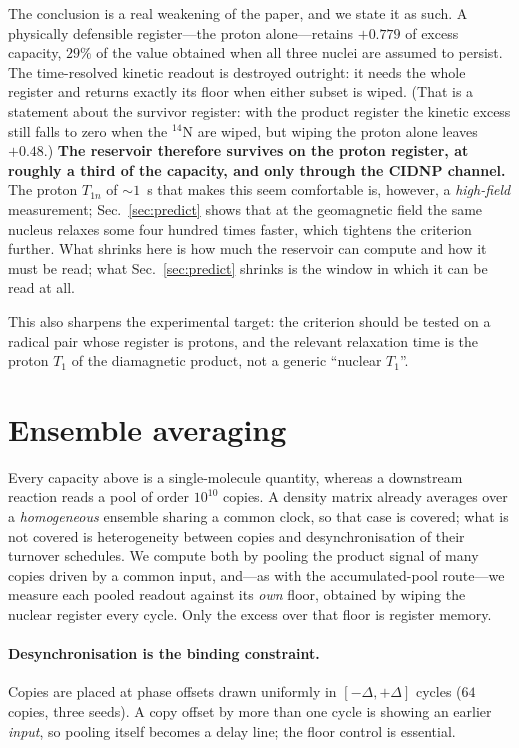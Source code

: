 \documentclass[aps,prx,reprint,superscriptaddress,nofootinbib,floatfix]{revtex4-2}
\begin{document}
The conclusion is a real weakening of the paper, and we state it as such. A
physically defensible register---the proton alone---retains
$+0.779$ of excess capacity, $29\%$ of the value obtained when all three nuclei
are assumed to persist. The time-resolved kinetic readout is destroyed outright:
it needs the whole register and returns exactly its floor when either subset is
wiped. (That is a statement about the survivor register: with the product register
the kinetic excess still falls to zero when the $^{14}$N are wiped, but wiping the
proton alone leaves $+0.48$.) \textbf{The reservoir therefore survives on the proton register, at roughly
a third of the capacity, and only through the CIDNP channel.} The proton
$T_{1n}$ of $\sim1$~s that makes this seem comfortable is, however, a
\emph{high-field} measurement; Sec.~\ref{sec:predict} shows that at the
geomagnetic field the same nucleus relaxes some four hundred times faster, which
tightens the criterion further. What shrinks here is how much the reservoir can
compute and how it must be read; what Sec.~\ref{sec:predict} shrinks is the
window in which it can be read at all.

This also sharpens the experimental target: the criterion should be tested on a
radical pair whose register is protons, and the relevant relaxation time is the
proton $T_1$ of the diamagnetic product, not a generic ``nuclear $T_1$''.

\section{Ensemble averaging}
\label{sec:ensemble}
Every capacity above is a single-molecule quantity, whereas a downstream reaction
reads a pool of order $10^{10}$ copies. A density matrix already averages over a
\emph{homogeneous} ensemble sharing a common clock, so that case is covered; what
is not covered is heterogeneity between copies and desynchronisation of their
turnover schedules. We compute both by pooling the product signal of many copies
driven by a common input, and---as with the accumulated-pool route---we measure
each pooled readout against its \emph{own} floor, obtained by wiping the nuclear
register every cycle. Only the excess over that floor is register memory.

\paragraph*{Desynchronisation is the binding constraint.} Copies are placed at
phase offsets drawn uniformly in $[-\Delta,+\Delta]$ cycles ($64$ copies, three
seeds). A copy offset by more than one cycle is showing an earlier \emph{input},
so pooling itself becomes a delay line; the floor control is essential.
\end{document}
